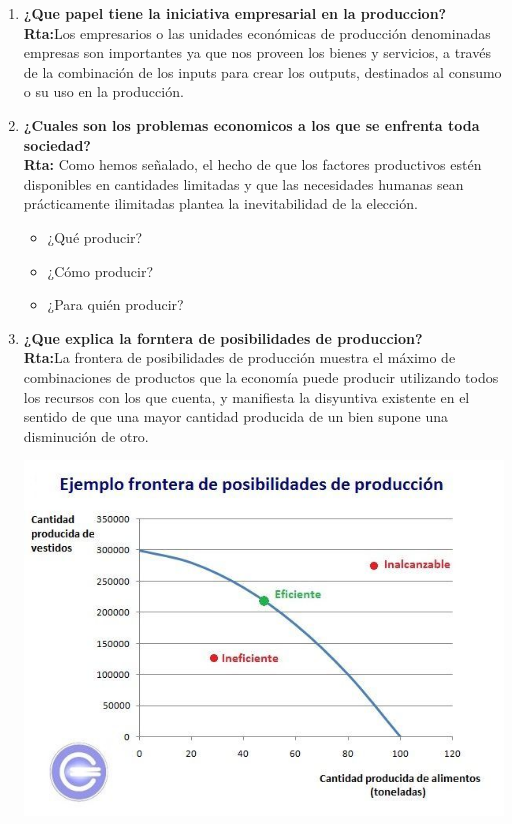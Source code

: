 \documentclass[12pt]{book}
\begin{document}
\begin{enumerate}
\item \textbf{¿Que papel tiene la iniciativa empresarial en la produccion?}
\\
\textbf{Rta:}Los empresarios o las unidades económicas de producción denominadas empresas son importantes ya que nos proveen los bienes y servicios, a través de la combinación de los inputs para crear los outputs, destinados al consumo o su uso en la producción.


\item \textbf{¿Cuales son los problemas economicos a los que se enfrenta toda sociedad?}
\\
\textbf{Rta:} Como hemos señalado, el hecho de que los factores productivos estén disponibles en cantidades limitadas y que las necesidades humanas sean prácticamente ilimitadas plantea la inevitabilidad de la elección.
\begin{itemize}
\item ¿Qué producir?
\item ¿Cómo producir?
\item ¿Para quién producir?
\end{itemize}


	

\item \textbf{¿Que explica la forntera de posibilidades de produccion?}
\\
\textbf{Rta:}La frontera de posibilidades de producción muestra el máximo de combinaciones de productos que la economía puede producir utilizando todos los recursos con los que cuenta, y manifiesta la disyuntiva existente en el sentido de que una mayor cantidad producida de un bien supone una disminución de otro.
\begin {center}
\includegraphics[scale=.4]{FPP.jpeg}
\end {center}


\end{enumerate}
\end{document}
